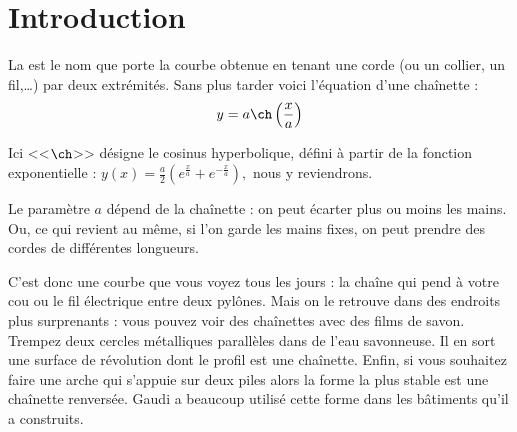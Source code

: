 \documentclass[class=report,crop=false]{standalone}
\begin{document}






\section*{Introduction}



\begin{minipage}{0.49\textwidth}
La  est le nom que porte la courbe obtenue en tenant 
une corde (ou un collier, un fil,\ldots) par deux extrémités.
Sans plus tarder voici l'équation d'une chaînette :
$$y = a \ch\left( \frac x a \right)$$  
\end{minipage}
\begin{minipage}{0.5\textwidth}
\end{minipage}


Ici <<$\ch$>> désigne le cosinus hyperbolique, défini à partir de la fonction exponentielle :
$y(x) = \frac a 2 \left( e^{\frac x a} + e^{-\frac x a} \right),$
 nous y reviendrons.


Le paramètre $a$ dépend de la chaînette : on peut écarter plus ou moins les mains.
Ou, ce qui revient au même, si l'on garde les mains fixes, on peut prendre des cordes de différentes longueurs.

C'est donc une courbe que vous voyez tous les jours :
la chaîne qui pend à votre cou ou le fil électrique entre deux pylônes.
Mais on le retrouve dans des endroits plus surprenants : 
vous pouvez voir des chaînettes avec des films de savon. 
Trempez deux cercles métalliques parallèles dans de l'eau savonneuse.
Il en sort une surface de révolution dont le profil est une chaînette.
Enfin, si vous souhaitez faire une arche qui s'appuie sur deux piles 
alors la forme la plus stable est une chaînette renversée.
Gaudi a beaucoup utilisé cette forme dans les bâtiments
qu'il a construits.

\bigskip
\end{document}
